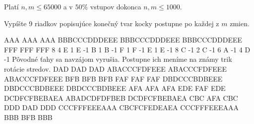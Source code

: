 \smallskip

Platí $n,m \leq 65000$
a v $50\%$ vstupov dokonca
$n,m \leq 1000$.


Vypíšte 9 riadkov popisujúce konečný tvar kocky
postupne po každej z $m$ zmien.


\sampleIN
AAA
AAA
AAA
BBBCCCDDDEEE
BBBCCCDDDEEE
BBBCCCDDDEEE
FFF
FFF
FFF
8 4
E 1
E -1
B 1
B -1
F 1
F -1
E 1
E -1
8 C -1
2 C -1
6 A -1
4 D -1
\sampleCOMMENT
Pôvodné ťahy sa navzájom vyrušia.
Postupne ich meníme na známy trik
rotácie stredov.
\sampleOUT
DAD
DAD
DAD
ABACCCFDFEEE
ABACCCFDFEEE
ABACCCFDFEEE
BFB
BFB
BFB
FAF
FAF
FAF
DBDCCCBDBEEE
DBDCCCBDBEEE
DBDCCCBDBEEE
AFA
AFA
AFA
EDE
FAF
EDE
DCDFCFBEBAEA
ABADCDFDFBEB
DCDFCFBEBAEA
CBC
AFA
CBC
DDD
DAD
DDD
CCCFFFEEEAAA
CBCFCFEDEAEA
CCCFFFEEEAAA
BBB
BFB
BBB

\sampleEND


